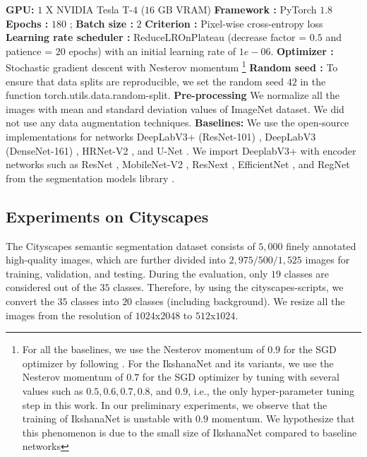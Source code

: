\documentclass{article}
\begin{document}
\noindent \textbf{GPU:} $1$ X NVIDIA Tesla T-$4$ ($16$ GB VRAM)\newline
\textbf{Framework :} PyTorch $1.8$ \cite{NEURIPS2019_9015}\newline
\textbf{Epochs :} $180$ ;
\textbf{Batch size :} $2$\newline
\textbf{Criterion :} Pixel-wise cross-entropy loss \newline
\textbf{Learning rate scheduler :} ReduceLROnPlateau (decrease factor = $0.5$ and patience = $20$ epochs) with an initial learning rate of $1e-06$. \newline
\textbf{Optimizer :} Stochastic gradient descent \cite{robbins1951stochastic} with Nesterov momentum \cite{nesterov1983method} \footnote{ For all the baselines, we use the Nesterov momentum  of $0.9$ for the SGD \cite{robbins1951stochastic} optimizer by following \cite{chen2018encoder,huang2017densely,he2016deep,mobileNetV2,TanL19,RegNet}. For the IkshanaNet and its variants, we use the Nesterov momentum of $0.7$ for the SGD \cite{robbins1951stochastic} optimizer by tuning with several values such as $0.5, 0.6, 0.7, 0.8$, and $0.9$, i.e., the only hyper-parameter tuning step in this work. In our preliminary experiments, we observe that the training of IkshanaNet is unstable with $0.9$ momentum. We hypothesize that this phenomenon is due to the small size of IkshanaNet compared to baseline networks} \newline
\textbf{Random seed :} To ensure that data splits are reproducible, we set the random seed $42$ in the function torch.utils.data.random-split. \newline
\textbf{Pre-processing} We normalize all the images with mean and standard deviation values of ImageNet \cite{deng2009imagenet} dataset. We did not use any data augmentation techniques.\newline
\textbf{Baselines:} We use the open-source implementations for networks DeepLabV3+ (ResNet-101) \cite{Resnet-101}, DeepLabV3 (DenseNet-161) \cite{Densenet-161}, HRNet-V2 \cite{HRNet-V2},  and U-Net \cite{U-Net}. We import DeeplabV3+ with encoder networks such as ResNet \cite{he2016deep}, MobileNet-V2 \cite{mobileNetV2}, ResNext \cite{Resnext}, EfficientNet \cite{TanL19}, and RegNet \cite{RegNet} from the segmentation models library \cite{Yakubovskiy:2019}.

\subsection{Experiments on Cityscapes}
\label{4.2}
The Cityscapes \cite{cordts2016cityscapes} semantic segmentation dataset consists of $5,000$ finely annotated high-quality images, which are further divided into $2,975/500/1,525$ images for training, validation, and testing.  During the evaluation, only $19$ classes are considered out of the $35$ classes. Therefore, by using the cityscapes-scripts, we convert the $35$ classes into $20$ classes (including background). We resize all the images from the resolution of $1024$x$2048$ to $512$x$1024$. 
\end{document}
